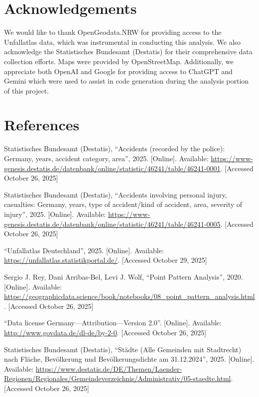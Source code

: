 \documentclass[10pt,a4paper]{article} %
\begin{document}
\section*{Acknowledgements}
We would like to thank OpenGeodata.NRW for providing access to the Unfallatlas data, which was instrumental in conducting this analysis. We also acknowledge the Statistisches Bundesamt (Destatis) for their comprehensive data collection efforts. Maps were provided by OpenStreetMap. Additionally, we appreciate both OpenAI and Google for providing access to ChatGPT and Gemini which were used to assist in code generation during the analysis portion of this project.

\newpage

\section*{References}
\begin{enumerate}[label={[\arabic*]}]
    \item Statistisches Bundesamt (Destatis), ``Accidents (recorded by the police): Germany, years, accident category, area'', 2025. [Online]. Available: \url{https://www-genesis.destatis.de/datenbank/online/statistic/46241/table/46241-0001}. [Accessed October 26, 2025] %
    \item Statistisches Bundesamt (Destatis), ``Accidents involving personal injury, casualties: Germany, years, type of accident/kind of accident, area, severity of injury'', 2025. [Online]. Available: \url{https://www-genesis.destatis.de/datenbank/online/statistic/46241/table/46241-0005}. [Accessed October 26, 2025] %
    \item ``Unfallatlas Deutschland'', 2025. [Online]. Available: \url{https://unfallatlas.statistikportal.de/}. [Accessed October 29, 2025] %
    \item Sergio J. Rey, Dani Arribas-Bel, Levi J. Wolf, ``Point Pattern Analysis'', 2020. [Online]. Available: \url{https://geographicdata.science/book/notebooks/08_point_pattern_analysis.html}. [Accessed October 26, 2025]
    \item ``Data license Germany---Attribution---Version 2.0''. [Online]. Available: \url{http://www.govdata.de/dl-de/by-2-0}. [Accessed October 26, 2025] %
    \item Statistisches Bundesamt (Destatis), ``Städte (Alle Gemeinden mit Stadtrecht) nach Fläche, Bevölkerung und Bevölkerungsdichte am 31.12.2024'', 2025. [Online]. Available: \url{https://www.destatis.de/DE/Themen/Laender-Regionen/Regionales/Gemeindeverzeichnis/Administrativ/05-staedte.html}. [Accessed October 26, 2025] %
\end{enumerate}
\end{document}
